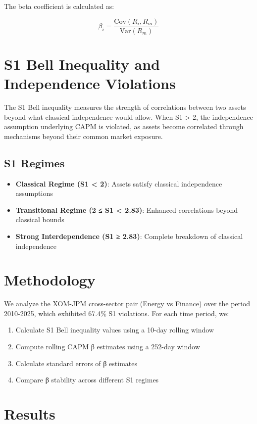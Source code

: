 \documentclass[11pt,a4paper]{article}
\begin{document}
The beta coefficient is calculated as:

\begin{equation}
\beta_i = \frac{\text{Cov}(R_i, R_m)}{\text{Var}(R_m)}
\end{equation}

\section{S1 Bell Inequality and Independence Violations}

The S1 Bell inequality measures the strength of correlations between two assets beyond what classical independence would allow. When S1 > 2, the independence assumption underlying CAPM is violated, as assets become correlated through mechanisms beyond their common market exposure.

\subsection{S1 Regimes}
\begin{itemize}
\item \textbf{Classical Regime (S1 < 2)}: Assets satisfy classical independence assumptions
\item \textbf{Transitional Regime (2 ≤ S1 < 2.83)}: Enhanced correlations beyond classical bounds
\item \textbf{Strong Interdependence (S1 ≥ 2.83)}: Complete breakdown of classical independence
\end{itemize}

\section{Methodology}

We analyze the XOM-JPM cross-sector pair (Energy vs Finance) over the period 2010-2025, which exhibited 67.4\% S1 violations. For each time period, we:

\begin{enumerate}
\item Calculate S1 Bell inequality values using a 10-day rolling window
\item Compute rolling CAPM β estimates using a 252-day window
\item Calculate standard errors of β estimates
\item Compare β stability across different S1 regimes
\end{enumerate}

\section{Results}
\end{document}
